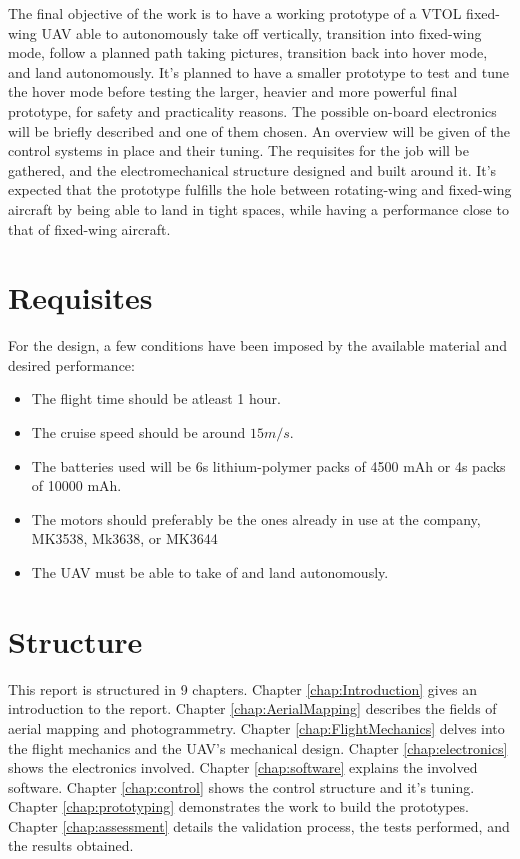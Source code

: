 %
The final objective of the work is to have a working prototype of a VTOL fixed-wing UAV able to autonomously take off vertically, transition into fixed-wing mode, follow a planned path taking pictures, transition back into hover mode, and land autonomously.
%
It's planned to have a smaller prototype to test and tune the hover mode before testing the larger, heavier and more powerful final prototype, for safety and practicality reasons.
%
The possible on-board electronics will be briefly described and one of them chosen.
%
An overview will be given of the control systems in place and their tuning.
%
The requisites for the job will be gathered, and the electromechanical structure designed and built around it.
%
It's expected that the prototype fulfills the hole between rotating-wing and fixed-wing aircraft by being able to land in tight spaces, while having a performance close to that of fixed-wing aircraft.

\section{Requisites}

For the design, a few conditions have been imposed by the available material and desired performance:

\begin{itemize}

\item The flight time should be atleast 1 hour.
\item The cruise speed should be around $15 m/s$.
\item The batteries used will be 6s lithium-polymer packs of 4500 mAh or 4s packs of 10000 mAh.
\item The motors should preferably be the ones already in use at the company, MK3538, Mk3638, or MK3644
\item The UAV must be able to take of and land autonomously.

\end{itemize}


\section{Structure}
	
%
This report is structured in 9 chapters.
%
Chapter \ref{chap:Introduction} gives an introduction to the report.
%
Chapter \ref{chap:AerialMapping} describes the fields of aerial mapping and photogrammetry.
%
Chapter \ref{chap:FlightMechanics} delves into the flight mechanics and the UAV's mechanical design.
%
Chapter \ref{chap:electronics} shows the electronics involved.
%
Chapter \ref{chap:software} explains the involved software.
%
Chapter \ref{chap:control} shows the control structure and it's tuning.
%
Chapter \ref{chap:prototyping} demonstrates the work to build the prototypes.
%
Chapter \ref{chap:assessment} details the validation process, the tests performed, and the results obtained.

